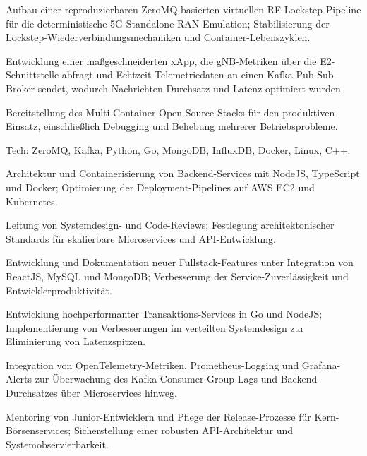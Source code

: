 \documentclass[10pt,a4paper]{resume}
\begin{document}
\bullets
  \item Aufbau einer reproduzierbaren ZeroMQ-basierten virtuellen RF-Lockstep-Pipeline für die deterministische 5G-Standalone-RAN-Emulation; Stabilisierung der Lockstep-Wiederverbindungsmechaniken und Container-Lebenszyklen.
  \item Entwicklung einer maßgeschneiderten xApp, die gNB-Metriken über die E2-Schnittstelle abfragt und Echtzeit-Telemetriedaten an einen Kafka-Pub-Sub-Broker sendet, wodurch Nachrichten-Durchsatz und Latenz optimiert wurden.
  \item Bereitstellung des Multi-Container-Open-Source-Stacks für den produktiven Einsatz, einschließlich Debugging und Behebung mehrerer Betriebsprobleme.
  \item Tech: ZeroMQ, Kafka, Python, Go, MongoDB, InfluxDB, Docker, Linux, C++.
\bulletsend
\vspace{1.5pt}
\bullets
  \item Architektur und Containerisierung von Backend-Services mit NodeJS, TypeScript und Docker; Optimierung der Deployment-Pipelines auf AWS EC2 und Kubernetes.
  \item Leitung von Systemdesign- und Code-Reviews; Festlegung architektonischer Standards für skalierbare Microservices und API-Entwicklung.
  \item Entwicklung und Dokumentation neuer Fullstack-Features unter Integration von ReactJS, MySQL und MongoDB; Verbesserung der Service-Zuverlässigkeit und Entwicklerproduktivität.
\bulletsend
\vspace{1.5pt}
\bullets
  \item Entwicklung hochperformanter Transaktions-Services in Go und NodeJS; Implementierung von Verbesserungen im verteilten Systemdesign zur Eliminierung von Latenzspitzen.
  \item Integration von OpenTelemetry-Metriken, Prometheus-Logging und Grafana-Alerts zur Überwachung des Kafka-Consumer-Group-Lags und Backend-Durchsatzes über Microservices hinweg.
  \item Mentoring von Junior-Entwicklern und Pflege der Release-Prozesse für Kern-Börsenservices; Sicherstellung einer robusten API-Architektur und Systemobservierbarkeit.
\bulletsend
\vspace{1.5pt}
\end{document}
